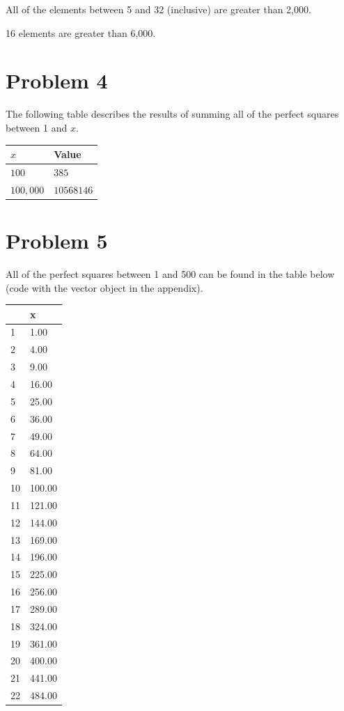 \documentclass{amsart}
\begin{document}
All of the elements between 5 and 32 (inclusive) are greater than 2,000.

16 elements are greater than 6,000.

\section{Problem 4}
The following table describes the results of summing all of the perfect
squares between 1 and $x$.
\begin{table}[ht]
\centering
\begin{tabular}{ll}
  \hline
    $x$ & Value \\
  \hline
  $100$ & $385$ \\
  $100,000$ & $10568146$ \\
   \hline
\end{tabular}
\end{table}

\section{Problem 5}
All of the perfect squares between 1 and 500 can be found in the table below
(code with the vector object in the appendix).
\begin{table}[ht]
\centering
\begin{tabular}{ll}
  \hline
 & x \\
  \hline
1 & 1.00 \\
  2 & 4.00 \\
  3 & 9.00 \\
  4 & 16.00 \\
  5 & 25.00 \\
  6 & 36.00 \\
  7 & 49.00 \\
  8 & 64.00 \\
  9 & 81.00 \\
  10 & 100.00 \\
  11 & 121.00 \\
  12 & 144.00 \\
  13 & 169.00 \\
  14 & 196.00 \\
  15 & 225.00 \\
  16 & 256.00 \\
  17 & 289.00 \\
  18 & 324.00 \\
  19 & 361.00 \\
  20 & 400.00 \\
  21 & 441.00 \\
  22 & 484.00 \\
   \hline
\end{tabular}
\end{table}
\end{document}

